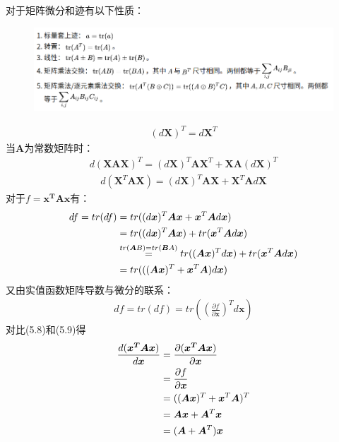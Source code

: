 \documentclass[40pt,a4paper，UTF8]{ctexart}
\numberwithin{equation}{section}
\begin{document}
对于矩阵微分和迹有以下性质：
\begin{figure}[H]
\centering
\includegraphics[width=4.8in]{ch4_5_1.png}
\end{figure}
\begin{align}
(d\bm X)^T=d\bm X^T
\end{align}
当$\bm A$为常数矩阵时：
\begin{align}
d(\bm{XAX})^T=(d\bm{X})^T\bm{AX}^T+\bm{XA}(d\bm{X})^T
\end{align}
\begin{align}
d(\bm{X}^T\bm{AX})=(d\bm{X})^T\bm{AX}+\bm{X}^T\bm{A}d\bm{X}
\end{align}
对于$f=\bm{x^TAx}$有：
\begin{align}
df=tr(df)&=tr((d\bm{x})^T\bm{Ax}+\bm{x}^T\bm{A}d\bm{x}) \notag \\
&=tr((d\bm x)^T\bm{Ax})+tr(\bm{x}^T\bm{A}d\bm{x}) \notag \\
& \overset{tr(\bm AB)=tr(\bm BA)}{=}
tr((\bm{Ax})^Td\bm x)+tr(\bm{x}^T\bm{A}d\bm{x}) \notag \\
&=tr(((\bm{Ax})^T+\bm{x}^T\bm{A}) d\bm{x})
\end{align}
又由实值函数矩阵导数与微分的联系：
\begin{align}
df=tr(df)=tr((\frac{\partial f}{\partial \bm x})^Td\bm{x})
\end{align}
对比(5.8)和(5.9)得
\begin{align}
\frac{d(\boldsymbol{x^TAx})}{d\boldsymbol x}
&=\frac{\partial({\boldsymbol{x^TAx}})}{\partial{\bm x}}  \notag \\
&=\frac{\partial f}{\partial \bm x} \notag \\
&=((\bm{Ax})^T+\bm{x}^T\bm{A})^T \notag \\
&=\bm{Ax}+\bm{A}^T\bm{x} \notag \\
&=(\bm A+\bm A^T)\bm x
\end{align}
\end{document}

